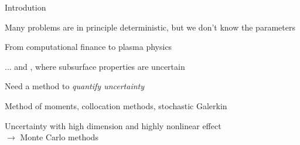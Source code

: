 \def\name{Introdution}
\begin{frame}{\name{}}
    \begin{squarelist}
        \item<1-> Many problems are in principle deterministic, but we don't know the parameters
        \begin{circlelist}
            \item From computational finance to plasma physics
            \item ... and , where subsurface properties are uncertain
        \end{circlelist}
        \item<2-> Need a method to \emph{quantify uncertainty}
        \begin{circlelist}
            \item Method of moments, collocation methods, stochastic Galerkin
            \item Uncertainty with high dimension and highly nonlinear effect \\
            $\rightarrow$ Monte Carlo methods
        \end{circlelist}
        
            
    \end{squarelist}
\end{frame}